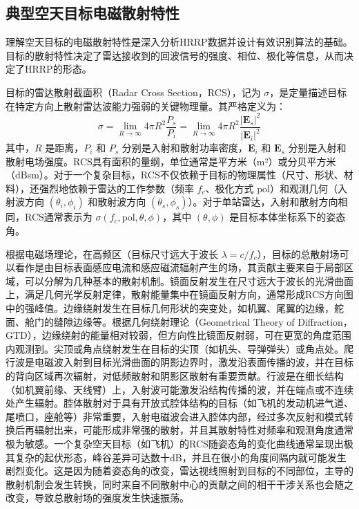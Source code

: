 \subsection{典型空天目标电磁散射特性}
\label{subsec:scattering_characteristics}

理解空天目标的电磁散射特性是深入分析HRRP数据并设计有效识别算法的基础。目标的散射特性决定了雷达接收到的回波信号的强度、相位、极化等信息，从而决定了HRRP的形态。

目标的雷达散射截面积（Radar Cross Section，RCS），记为 $\sigma$，是定量描述目标在特定方向上散射雷达波能力强弱的关键物理量。其严格定义为：
\begin{equation}
    \sigma = \lim_{R \to \infty} 4\pi R^2 \frac{P_s}{P_i} = \lim_{R \to \infty} 4\pi R^2 \frac{|\mathbf{E}_s|^2}{|\mathbf{E}_i|^2}
    \label{eq:rcs_definition}
\end{equation}
其中，$R$ 是距离，$P_i$ 和 $P_s$ 分别是入射和散射功率密度，$\mathbf{E}_i$ 和 $\mathbf{E}_s$ 分别是入射和散射电场强度。RCS具有面积的量纲，单位通常是平方米（m²）或分贝平方米（dBsm）。对于一个复杂目标，RCS不仅依赖于目标的物理属性（尺寸、形状、材料），还强烈地依赖于雷达的工作参数（频率 $f_c$、极化方式 $\text{pol}$）和观测几何（入射波方向 $(\theta_i, \phi_i)$ 和散射波方向 $(\theta_s, \phi_s)$）。对于单站雷达，入射和散射方向相同，RCS通常表示为 $\sigma(f_c, \text{pol}, \theta, \phi)$，其中 $(\theta, \phi)$ 是目标本体坐标系下的姿态角。

根据电磁场理论，在高频区（目标尺寸远大于波长 $\lambda = c/f_c$），目标的总散射场可以看作是由目标表面感应电流和感应磁流辐射产生的场，其贡献主要来自于局部区域，可以分解为几种基本的散射机制。镜面反射发生在尺寸远大于波长的光滑曲面上，满足几何光学反射定律，散射能量集中在镜面反射方向，通常形成RCS方向图中的强峰值。边缘绕射发生在目标几何形状的突变处，如机翼、尾翼的边缘，舵面、舱门的缝隙边缘等。根据几何绕射理论（Geometrical Theory of Diffraction，GTD），边缘绕射的能量相对较弱，但方向性比镜面反射弱，可在更宽的角度范围内观测到。尖顶或角点绕射发生在目标的尖顶（如机头、导弹弹头）或角点处。爬行波是电磁波入射到目标光滑曲面的阴影边界时，激发沿表面传播的波，并在目标的背向区域再次辐射，对低频散射和阴影区散射有重要贡献。行波是在细长结构（如机翼前缘、天线臂）上，入射波可能激发沿结构传播的波，并在端点或不连续处产生辐射。腔体散射对于具有开放式腔体结构的目标（如飞机的发动机进气道、尾喷口，座舱等）非常重要，入射电磁波会进入腔体内部，经过多次反射和模式转换后再辐射出来，可能形成非常强的散射，并且其散射特性对频率和观测角度通常极为敏感。一个复杂空天目标（如飞机）的RCS随姿态角的变化曲线通常呈现出极其复杂的起伏形态，峰谷差异可达数十dB，并且在很小的角度间隔内就可能发生剧烈变化。这是因为随着姿态角的改变，雷达视线照射到目标的不同部位，主导的散射机制会发生转换，同时来自不同散射中心的贡献之间的相干干涉关系也会随之改变，导致总散射场的强度发生快速振荡。


